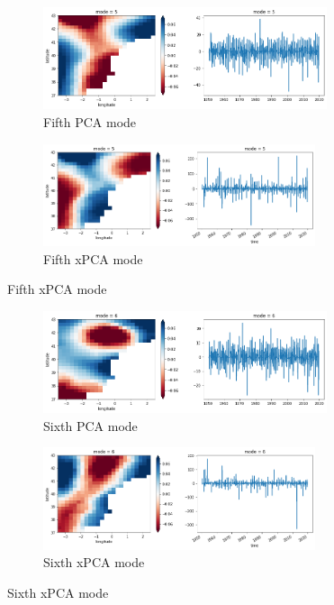 \documentclass[11pt, oneside]{book}
\theoremstyle{plain}
\theoremstyle{remark}
\begin{document}
\begin{figure}[h!]
\centering
\begin{subfigure}{.5\textwidth}
    \centering
    \includegraphics[width=.95\linewidth, height=3cm]{vlc-mode5}
    \caption{Fifth PCA mode}
\end{subfigure}%
\begin{subfigure}{.5\textwidth}
    \centering
    \includegraphics[width=.95\linewidth, height=3cm]{vlc-tran-mode5}
    \caption{Fifth xPCA mode}
\end{subfigure}
\end{figure}
\begin{figure}[h!]
\centering
\begin{subfigure}{.5\textwidth}
    \centering
    \includegraphics[width=.95\linewidth, height=3cm]{vlc-mode6}
    \caption{Sixth PCA mode}
\end{subfigure}%
\begin{subfigure}{.5\textwidth}
    \centering
    \includegraphics[width=.95\linewidth, height=3cm]{vlc-tran-mode6}
    \caption{Sixth xPCA mode}
\end{subfigure}
\end{figure}
\end{document}
